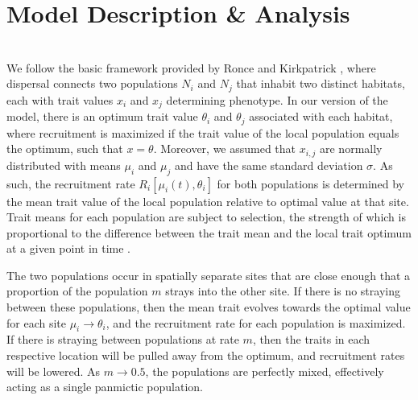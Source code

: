 \documentclass{revtex4}
\begin{document}



\section{Model Description \& Analysis}

\\
\noindent We follow the basic framework provided by Ronce and Kirkpatrick \cite{Ronce:2001dp}, where dispersal connects two populations $N_i$ and $N_j$ that inhabit two distinct habitats, each with trait values $x_i$ and $x_j$ determining phenotype.
In our version of the model, there is an optimum trait value $\theta_i$ and $\theta_j$ associated with each habitat, where recruitment is maximized if the trait value of the local population equals the optimum, such that $x = \theta$.
Moreover, we assumed that $x_{i,j}$ are normally distributed with means $\mu_i$ and $\mu_j$ and have the same standard deviation $\sigma$.
As such, the recruitment rate $R_i[\mu_i(t),\theta_i]$ for both populations is determined by the mean trait value of the local population relative to optimal value at that site.
Trait means for each population are subject to selection, the strength of which is proportional to the difference between the trait mean and the local trait optimum at a given point in time \citep{simpson1953major,Lande:1976ga,Ronce:2001dp}.

The two populations occur in spatially separate sites that are close enough that a proportion of the population $m$ strays into the other site.
If there is no straying between these populations, then the mean trait evolves towards the optimal value for each site $\mu_i \rightarrow \theta_i$, and the recruitment rate for each population is maximized.
If there is straying between populations at rate $m$, then the traits in each respective location will be pulled away from the optimum, and recruitment rates will be lowered.
As $m \rightarrow 0.5$, the populations are perfectly mixed, effectively acting as a single panmictic population.
\end{document}
